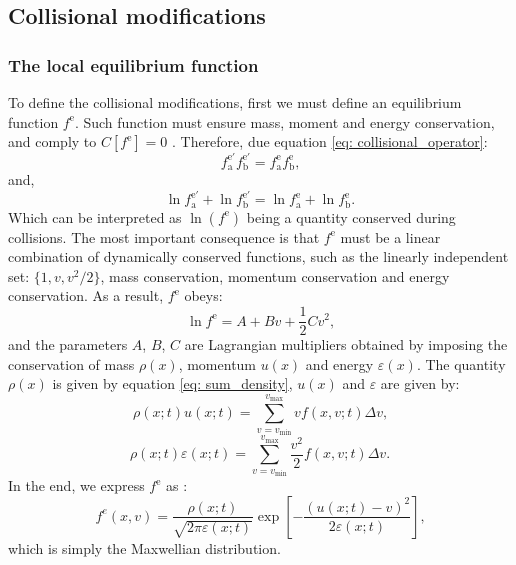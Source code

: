 \documentclass[fleqn,usenatbib]{mnras}
\begin{document}
\subsection{Collisional modifications}
\label{sec: collisional}
\subsubsection{The local equilibrium function}
To define the collisional modifications, first we must define an equilibrium function $f^\text{e}$. Such function must ensure mass, moment and energy conservation, and comply to $C[f^\text{e}] = 0$ \citep{book:460703}. Therefore, due equation \ref{eq: collisional_operator}:
\begin{equation}
f_\text{a}^{\text{e}\prime}  f_\text{b}^{\text{e}\prime} = f_\text{a}^\text{e} f_\text{b}^\text{e} \text{,}
\end{equation}
and,
\begin{equation}
\ln f_\text{a}^{\text{e}\prime} + \ln f_\text{b}^{\text{e}\prime} = \ln f_\text{a}^\text{e} + \ln f_\text{b}^\text{e} \text{.}
\end{equation}
Which can be interpreted as $\ln(f^\text{e})$ being a quantity conserved during collisions. The most important consequence is that $f^\text{e}$ must be a linear combination of dynamically conserved functions, such as the linearly independent set: $\{1,v, v^2/2\}$, mass conservation, momentum conservation and energy conservation. As a result, $f^\text{e}$ obeys:
\begin{equation}
\ln f^{\text{e}} = A + B v + \frac{1}{2} C v^2\text{,}
\end{equation}
and the parameters $A$, $B$, $C$ are Lagrangian multipliers obtained by imposing the conservation of mass $\rho(x)$, momentum $u(x)$ and energy $\varepsilon (x)$. The quantity $\rho(x)$ is given by equation \ref{eq: sum_density}, $u(x)$ and $\varepsilon$ are given by:
\begin{equation}
\rho (x;t) u(x;t)= \sum\limits_{v= v_{\text{min}}}^{v_{\text{max}}} v f(x,v;t) \Delta v\text{,}
\end{equation}
\begin{equation}
\rho (x;t) \varepsilon(x;t)= \sum\limits_{v= v_{\text{min}}}^{v_{\text{max}}} \frac{v^2}{2} f(x,v;t) \Delta v\text{.}
\end{equation}
In the end, we express $f^\text{e}$ as \citep{asinari}:
\begin{equation}
f^e(x,v) = \frac{\rho(x;t)}{\sqrt{2 \pi \varepsilon(x;t)}} \exp[-\frac{(u(x;t)-v)^2}{2\varepsilon (x;t)}]\text{,}
\end{equation}
which is simply the Maxwellian distribution.
\end{document}
